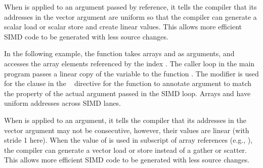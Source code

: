 When  is applied to an argument passed by reference, it 
tells the compiler that its addresses in the vector argument are uniform 
so that the compiler can generate a scalar load or scalar store and create 
linear values. This allows more efficient SIMD code to be generated with 
less source changes.


In the following example, the function  takes arrays  and  as arguments, and accesses the array elements referenced by 
the index .
The caller loop  in the main program passes a linear copy of
the variable  to the function .
The  modifier is used for the  clause 
in the ~ directive for the function
 to annotate argument  to match the property of 
the actual argument  passed in the SIMD loop.
Arrays  and  have uniform addresses across SIMD lanes.

When  is applied to an argument, 
it tells the compiler that its addresses in the vector argument may not be 
consecutive, however, their values are linear (with stride 1 here). When the value of  is used 
in subscript of array references (e.g., ), the compiler can generate 
a vector load or store instead of a gather or scatter. This allows more 
efficient SIMD code to be generated with less source changes.



